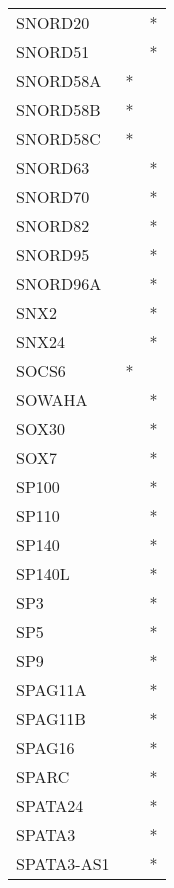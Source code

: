 \begin{longtable}{lcc}
SNORD20         &                &          * \\
SNORD51         &                &          * \\
SNORD58A        &              * &            \\
SNORD58B        &              * &            \\
SNORD58C        &              * &            \\
SNORD63         &                &          * \\
SNORD70         &                &          * \\
SNORD82         &                &          * \\
SNORD95         &                &          * \\
SNORD96A        &                &          * \\
SNX2            &                &          * \\
SNX24           &                &          * \\
SOCS6           &              * &            \\
SOWAHA          &                &          * \\
SOX30           &                &          * \\
SOX7            &                &          * \\
SP100           &                &          * \\
SP110           &                &          * \\
SP140           &                &          * \\
SP140L          &                &          * \\
SP3             &                &          * \\
SP5             &                &          * \\
SP9             &                &          * \\
SPAG11A         &                &          * \\
SPAG11B         &                &          * \\
SPAG16          &                &          * \\
SPARC           &                &          * \\
SPATA24         &                &          * \\
SPATA3          &                &          * \\
SPATA3-AS1      &                &          * \\

\end{longtable}
